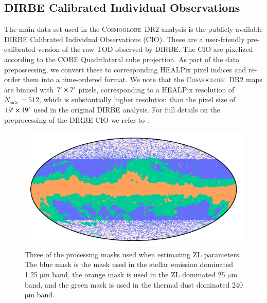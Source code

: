 \documentclass[twocolumn]{aa}
\newcommand{\cosmoglobe}{\textsc{Cosmoglobe}}
\begin{document}
\subsection{DIRBE Calibrated Individual Observations}
The main data set used in the \cosmoglobe\ DR2 analysis is the
publicly available DIRBE Calibrated Individual Observations
(CIO). These are a user-friendly pre-calibrated version of the raw TOD
observed by DIRBE. The CIO are pixelized according to the COBE
Quadrilateral cube projection. As part of the data prepossessing, we
convert these to corresponding HEALPix pixel indices and re-order
them into a time-ordered format. We note that the \cosmoglobe\ DR2
maps are binned with $7\arcm \times 7\arcm$ pixels, corresponding to a
HEALPix resolution of $N_{\mathrm{side}}=512$, which is substantially
higher resolution than the pixel size of $19\arcm \times 19\arcm$ used
in the original DIRBE analysis. For full details on the
preprocessing of the DIRBE CIO we refer to \cite{CG02_01}.

\begin{figure}
    \centering
    \includegraphics[width=\columnwidth]{figs/zodi_proc_masks.pdf}
    \caption{Three of the processing masks used when estimating ZL parameters. The blue mask is the 
    mask used in the stellar emission dominated 1.25 $\mathrm{\mu m}$ band, the orange mask is used 
    in the ZL dominated 25 $\mathrm{\mu m}$ band, and the green mask is used in the thermal dust dominated 
    240 $\mathrm{\mu m}$ band.}
    \label{fig:zodi-procmask}
\end{figure}
\end{document}

